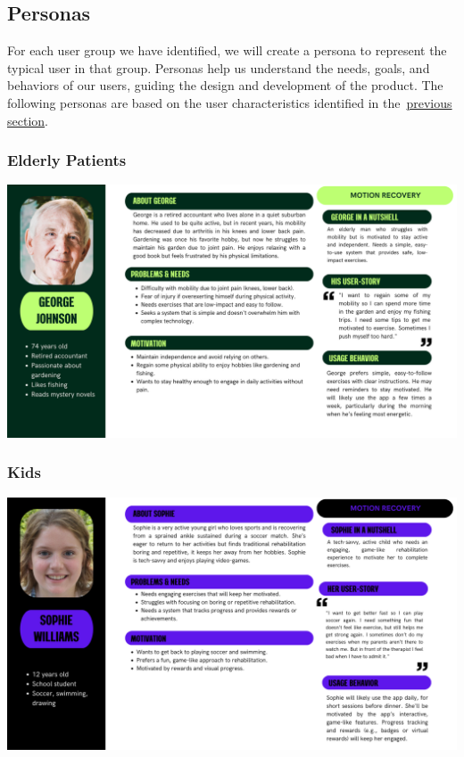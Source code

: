 \subsection{Personas}
    For each user group we have identified, we will create a persona to represent the typical user in that group. 
    Personas help us understand the needs, goals, and behaviors of our users, guiding the design and development of the product.
    The following personas are based on the user characteristics identified in the~\hyperref[subsec:hands_on_users]{previous section}.
    \subsubsection{Elderly Patients}
    \includegraphics[width=\textwidth]{images/personas/patient_elderly.png}
    \subsubsection{Kids}
    \includegraphics[width=\textwidth]{images/personas/patient_kid.png}
